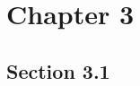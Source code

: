 \chapter{Chapter 3}
\label{cap2}
\onehalfspacing

\section{Section 3.1}\label{sec:met}

\lipsum[9-11]